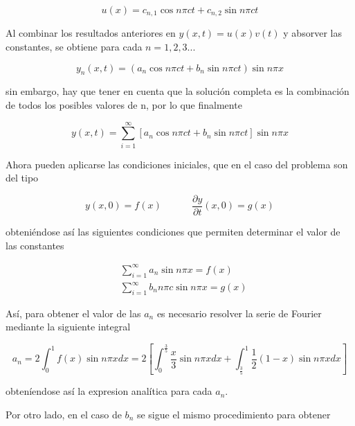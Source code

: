 \documentclass[11pt]{article}
\begin{document}
\begin{equation}
	u(x) = c_{n,1}\cos{n\pi{c}t} + c_{n,2}\sin{n\pi{c}t}
\end{equation}

Al combinar los resultados anteriores en $y(x,t) = u(x)v(t)$ y absorver las constantes, se
obtiene para cada $n = 1, 2, 3 ...$

\begin{equation}
	y_n(x,t) = (a_n\cos{n\pi{c}t} + b_n\sin{n\pi{c}t})\sin{n\pi{x}}
\end{equation}

sin embargo, hay que tener en cuenta que la solución completa es la combinación de todos
los posibles valores de n, por lo que finalmente

\begin{equation}
	y(x,t) = \sum\limits_{i=1}^\infty[a_n\cos{n\pi{c}t} + b_n\sin{n\pi{c}t}]\sin{n\pi{x}}
\label{eq:sol_analitica}
\end{equation}

Ahora pueden aplicarse las condiciones iniciales, que en el caso del problema son del tipo

\begin{equation}
	y(x, 0) = f(x)~~~~~~~~~~~~~~\frac{\partial{y}}{\partial{t}}(x, 0) = g(x)
\end{equation}

obteniéndose así las siguientes condiciones que permiten determinar el valor de las
constantes

\begin{subequations}
\begin{flalign}
	&\sum\limits_{i=1}^\infty a_n \sin{n\pi{x}} = f(x)\\
	&\sum\limits_{i=1}^\infty b_n n\pi{c} \sin{n\pi{x}} = g(x)
\end{flalign}
\end{subequations}

Así, para obtener el valor de las $a_n$ es necesario resolver la serie de Fourier mediante
la siguiente integral

\begin{equation}
	a_n = 2 \int_0^1 f(x) \sin{n\pi{x}}dx = 2[\int_0^\frac{3}{5} \frac{x}{3} \sin{n\pi{x}}dx
	+ \int_{\frac{3}{5}}^1 \frac{1}{2}(1-x) \sin{n\pi{x}}dx]
\end{equation}

obteníendose así la expresion analítica para cada $a_n$.

Por otro lado, en el caso de $b_n$ se sigue el mismo procedimiento para obtener
\end{document}
